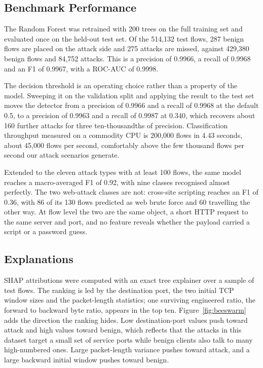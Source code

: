 \documentclass[runningheads]{llncs}
\begin{document}
\subsection{Benchmark Performance}

The Random Forest was retrained with 200 trees on the full training set and evaluated once on the held-out test set. Of the 514,132 test flows, 287 benign flows are placed on the attack side and 275 attacks are missed, against 429,380 benign flows and 84,752 attacks. This is a precision of 0.9966, a recall of 0.9968 and an F1 of 0.9967, with a ROC-AUC of 0.9998.

The decision threshold is an operating choice rather than a property of the model. Sweeping it on the validation split and applying the result to the test set moves the detector from a precision of 0.9966 and a recall of 0.9968 at the default 0.5, to a precision of 0.9963 and a recall of 0.9987 at 0.340, which recovers about 160 further attacks for three ten-thousandths of precision. Classification throughput measured on a commodity CPU is 200,000 flows in 4.43 seconds, about 45,000 flows per second, comfortably above the few thousand flows per second our attack scenarios generate.

Extended to the eleven attack types with at least 100 flows, the same model reaches a macro-averaged F1 of 0.92, with nine classes recognised almost perfectly. The two web-attack classes are not: cross-site scripting reaches an F1 of 0.36, with 86 of its 130 flows predicted as web brute force and 60 travelling the other way. At flow level the two are the same object, a short HTTP request to the same server and port, and no feature reveals whether the payload carried a script or a password guess.

\subsection{Explanations}

SHAP attributions were computed with an exact tree explainer over a sample of test flows. The ranking is led by the destination port, the two initial TCP window sizes and the packet-length statistics; one surviving engineered ratio, the forward to backward byte ratio, appears in the top ten. Figure~\ref{fig:beeswarm} adds the direction the ranking hides. Low destination-port values push toward attack and high values toward benign, which reflects that the attacks in this dataset target a small set of service ports while benign clients also talk to many high-numbered ones. Large packet-length variance pushes toward attack, and a large backward initial window pushes toward benign.
\end{document}
